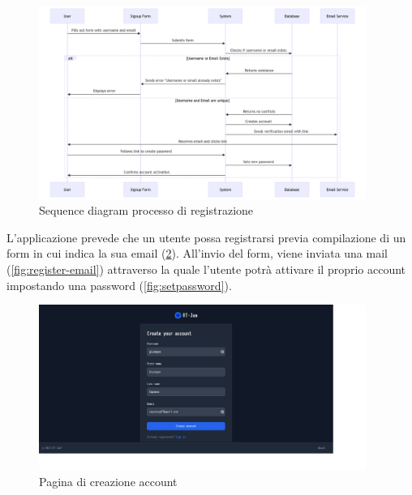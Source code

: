 \documentclass{article}
\begin{document}
\begin{figure}
  \begin{center}
    \includegraphics[width=0.95\textwidth]{figures/sq_registration.png}
  \end{center}
  \caption{Sequence diagram processo di registrazione}\label{fig:registration-process}
\end{figure}

L'applicazione prevede che un utente possa registrarsi previa compilazione di un form in 
cui indica la sua email (\cref{fig:sign-up-page}). 
All'invio del form, viene inviata una mail (\cref{fig:register-email})
attraverso la quale l'utente potrà attivare il proprio account impostando una password
(\cref{fig:setpassword}). 

\begin{figure}
  \begin{center}
    \includegraphics[width=0.95\textwidth]{figures/register_page.png}
  \end{center}
  \caption{Pagina di creazione account}\label{fig:sign-up-page}
\end{figure}
\end{document}
